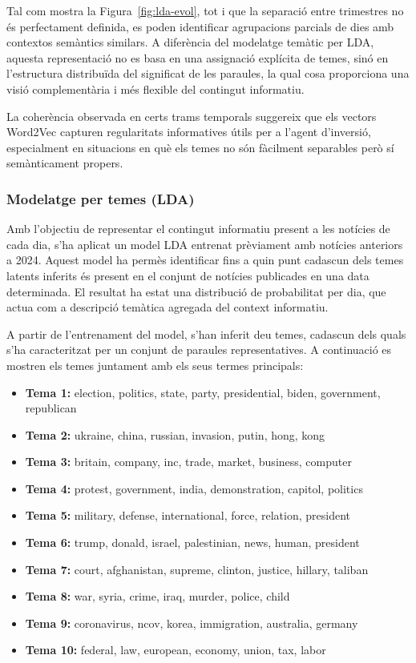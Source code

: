 \documentclass[12pt,a4paper,twoside]{book}
\begin{document}
Tal com mostra la Figura~\ref{fig:lda-evol}, tot i que la separació entre trimestres no és perfectament definida, es poden identificar agrupacions parcials de dies amb contextos semàntics similars. A diferència del modelatge temàtic per LDA, aquesta representació no es basa en una assignació explícita de temes, sinó en l’estructura distribuïda del significat de les paraules, la qual cosa proporciona una visió complementària i més flexible del contingut informatiu.

La coherència observada en certs trams temporals suggereix que els vectors Word2Vec capturen regularitats informatives útils per a l’agent d’inversió, especialment en situacions en què els temes no són fàcilment separables però sí semànticament propers.


\subsubsection{Modelatge per temes (LDA)}

Amb l’objectiu de representar el contingut informatiu present a les notícies de cada dia, s’ha aplicat un model LDA entrenat prèviament amb notícies anteriors a 2024. Aquest model ha permès identificar fins a quin punt cadascun dels temes latents inferits és present en el conjunt de notícies publicades en una data determinada. El resultat ha estat una distribució de probabilitat per dia, que actua com a descripció temàtica agregada del context informatiu.

A partir de l’entrenament del model, s’han inferit deu temes, cadascun dels quals s’ha caracteritzat per un conjunt de paraules representatives. A continuació es mostren els temes juntament amb els seus termes principals:

\begin{itemize}
    \item \textbf{Tema 1:} election, politics, state, party, presidential, biden, government, republican
    \item \textbf{Tema 2:} ukraine, china, russian, invasion, putin, hong, kong
    \item \textbf{Tema 3:} britain, company, inc, trade, market, business, computer
    \item \textbf{Tema 4:} protest, government, india, demonstration, capitol, politics
    \item \textbf{Tema 5:} military, defense, international, force, relation, president
    \item \textbf{Tema 6:} trump, donald, israel, palestinian, news, human, president
    \item \textbf{Tema 7:} court, afghanistan, supreme, clinton, justice, hillary, taliban
    \item \textbf{Tema 8:} war, syria, crime, iraq, murder, police, child
    \item \textbf{Tema 9:} coronavirus, ncov, korea, immigration, australia, germany
    \item \textbf{Tema 10:} federal, law, european, economy, union, tax, labor
\end{itemize}
\end{document}
